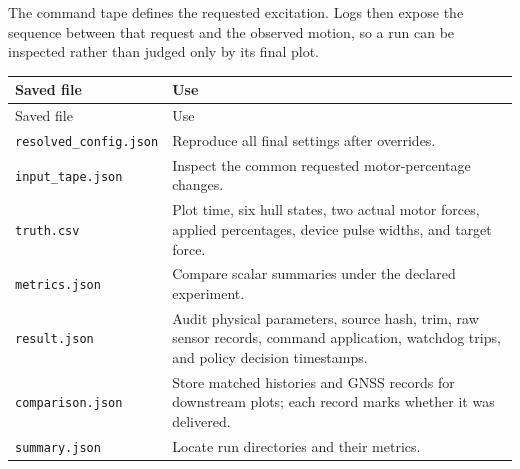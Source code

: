 \documentclass[10pt,letterpaper]{article}
\begin{document}
The command tape defines the requested excitation. Logs then expose the sequence between that request and the observed motion, so a run can be inspected rather than judged only by its final plot.


{\footnotesize
\setlength{\tabcolsep}{5pt}
\renewcommand{\arraystretch}{1.18}
\begin{longtable}{@{}>{\raggedright\arraybackslash}p{}>{\raggedright\arraybackslash}p{}@{}}
\toprule
Saved file & Use \\
\midrule
\endfirsthead
\toprule
Saved file & Use \\
\midrule
\endhead
\bottomrule
\endfoot
\texttt{resolved\_config.json} & Reproduce all final settings after overrides. \\
\addlinespace[3pt]
\texttt{input\_tape.json} & Inspect the common requested motor-percentage changes. \\
\addlinespace[3pt]
\texttt{truth.csv} & Plot time, six hull states, two actual motor forces, applied percentages, device pulse widths, and target force. \\
\addlinespace[3pt]
\texttt{metrics.json} & Compare scalar summaries under the declared experiment. \\
\addlinespace[3pt]
\texttt{result.json} & Audit physical parameters, source hash, trim, raw sensor records, command application, watchdog trips, and policy decision timestamps. \\
\addlinespace[3pt]
\texttt{comparison.json} & Store matched histories and GNSS records for downstream plots; each record marks whether it was delivered. \\
\addlinespace[3pt]
\texttt{summary.json} & Locate run directories and their metrics. \\
\end{longtable}
}
\end{document}
